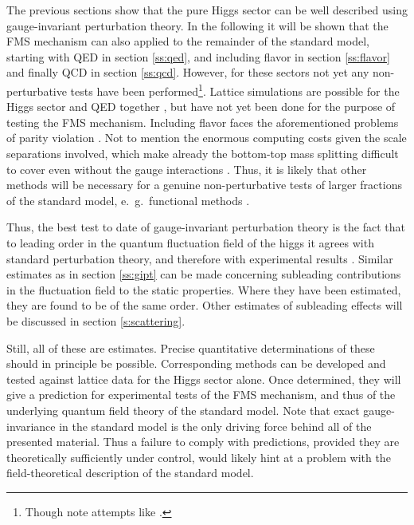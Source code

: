 \documentclass[final,12pt,3p,longtitle]{elsarticle}
\newcommand*{\1}{1\!\!\!\bot}
\begin{document}
The previous sections show that the pure Higgs sector can be well described using gauge-invariant perturbation theory. In the following it will be shown that the FMS mechanism can also applied to the remainder of the standard model, starting with QED in section \ref{ss:qed}, and including flavor in section \ref{ss:flavor} and finally QCD in section \ref{ss:qcd}. However, for these sectors not yet any non-perturbative tests have been performed\footnote{Though note attempts like \cite{Aoki:1989xe}.}. Lattice simulations are possible for the Higgs sector and QED together \cite{Zubkov:2010np,Zubkov:2011sk,Zubkov:2011ia,Lucini:2015hfa,Shrock:1985un}, but have not yet been done for the purpose of testing the FMS mechanism. Including flavor faces the aforementioned problems of parity violation \cite{Hasenfratz:2007dp,Grabowska:2015qpk,Gattringer:2008je,Cundy:2010pu,Igarashi:2009kj}. Not to mention the enormous computing costs given the scale separations involved, which make already the bottom-top mass splitting difficult to cover even without the gauge interactions \cite{Gerhold:2007gx,Gerhold:2011mx}. Thus, it is likely that other methods will be necessary for a genuine non-perturbative tests of larger fractions of the standard model, e.\ g.\ functional methods \cite{Maas:2011se,Alkofer:2000wg,Gies:2006wv,Kopietz:2010zz,Binosi:2009qm,Boucaud:2011ug,Roberts:2015lja}.

Thus, the best test to date of gauge-invariant perturbation theory is the fact that to leading order in the quantum fluctuation field of the higgs it agrees with standard perturbation theory, and therefore with experimental results \cite{pdg}. Similar estimates as in section \ref{ss:gipt} can be made concerning subleading contributions in the fluctuation field to the static properties. Where they have been estimated, they are found to be of the same order. Other estimates of subleading effects will be discussed in section \ref{s:scattering}.

Still, all of these are estimates. Precise quantitative determinations of these should in principle be possible. Corresponding methods can be developed and tested against lattice data for the Higgs sector alone. Once determined, they will give a prediction for experimental tests of the FMS mechanism, and thus of the underlying quantum field theory of the standard model. Note that exact gauge-invariance in the standard model is the only driving force behind all of the presented material. Thus a failure to comply with predictions, provided they are theoretically sufficiently under control, would likely hint at a problem with the field-theoretical description of the standard model.
\end{document}
